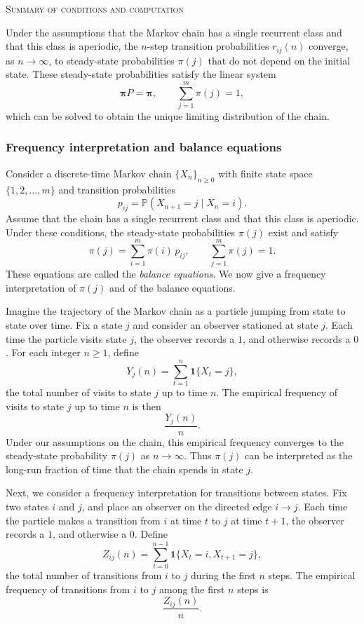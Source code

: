 \bigskip
\textsc{Summary of conditions and computation}

Under the assumptions that the Markov chain has a single recurrent class and that this class is aperiodic, the \(n\)-step transition probabilities \(r_{ij}(n)\) converge, as \(n \to \infty\), to steady-state probabilities \(\pi(j)\) that do not depend on the initial state.
These steady-state probabilities satisfy the linear system
\[
\boldsymbol{\pi} P = \boldsymbol{\pi},
\qquad
\sum_{j=1}^{m} \pi(j) = 1,
\]
which can be solved to obtain the unique limiting distribution of the chain.

\subsubsection{Frequency interpretation and balance equations}

Consider a discrete-time Markov chain \(\{X_n\}_{n \ge 0}\) with finite state space \(\{1,2,\dots,m\}\) and transition probabilities
\[
p_{ij}
=
\mathbb{P}(X_{n+1} = j \mid X_n = i).
\]
Assume that the chain has a single recurrent class and that this class is aperiodic.
Under these conditions, the steady-state probabilities \(\pi(j)\) exist and satisfy
\[
\pi(j)
=
\sum_{i=1}^{m} \pi(i) \, p_{ij},
\qquad
\sum_{j=1}^{m} \pi(j) = 1.
\]
These equations are called the \textit{balance equations}.
We now give a frequency interpretation of \(\pi(j)\) and of the balance equations.

Imagine the trajectory of the Markov chain as a particle jumping from state to state over time.
Fix a state \(j\) and consider an observer stationed at state \(j\).
Each time the particle visits state \(j\), the observer records a \(1\), and otherwise records a \(0\).
For each integer \(n \ge 1\), define
\[
Y_j(n)
=
\sum_{t=1}^{n} \mathbf{1}\{X_t = j\},
\]
the total number of visits to state \(j\) up to time \(n\).
The empirical frequency of visits to state \(j\) up to time \(n\) is then
\[
\frac{Y_j(n)}{n}.
\]
Under our assumptions on the chain, this empirical frequency converges to the steady-state probability \(\pi(j)\) as \(n \to \infty\).
Thus \(\pi(j)\) can be interpreted as the long-run fraction of time that the chain spends in state \(j\).

Next, we consider a frequency interpretation for transitions between states.
Fix two states \(i\) and \(j\), and place an observer on the directed edge \(i \to j\).
Each time the particle makes a transition from \(i\) at time \(t\) to \(j\) at time \(t+1\), the observer records a \(1\), and otherwise a \(0\).
Define
\[
Z_{ij}(n)
=
\sum_{t=0}^{n-1} \mathbf{1}\{X_t = i, X_{t+1} = j\},
\]
the total number of transitions from \(i\) to \(j\) during the first \(n\) steps.
The empirical frequency of transitions from \(i\) to \(j\) among the first \(n\) steps is
\[
\frac{Z_{ij}(n)}{n}.
\]

